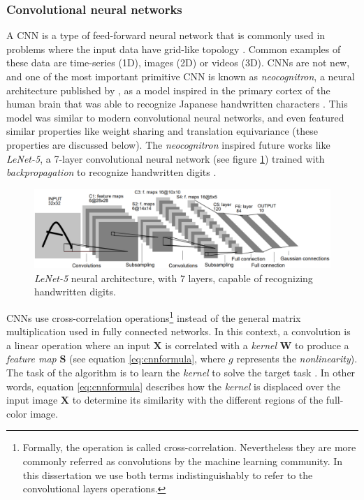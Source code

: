 \subsubsection{Convolutional neural networks}
A CNN is a type of feed-forward neural network that is commonly used in problems where the input data have grid-like topology \autocite{Goodfellow2016}. Common examples of these data are time-series (1D), images (2D) or videos (3D). CNNs are not new, and one of the most important primitive CNN is known as \textit{neocognitron}, a neural architecture published by \citealp{fukushima1980}, as a model inspired in the primary cortex of the human brain that was able to recognize Japanese handwritten characters \autocite{fukushima1980}. This model was similar to modern convolutional neural networks, and even featured similar properties like weight sharing and translation equivariance (these properties are discussed below). The \textit{neocognitron} inspired future works like \textit{LeNet-5}, a 7-layer convolutional neural network (see figure \ref{fig:lenet5}) trained with \textit{backpropagation} to recognize handwritten digits \autocite{lecun1998}.

\begin{figure}
	\centering
	\includegraphics[width=0.85\linewidth]{background/images/lenet5}
	\caption[\textit{LeNet-5} architecture]{\textit{LeNet-5} neural architecture, with 7 layers, capable of recognizing handwritten digits.}
	\label{fig:lenet5}
\end{figure}

CNNs use cross-correlation operations\footnote{Formally, the operation is called cross-correlation. Nevertheless they are more commonly referred as convolutions by the machine learning community. In this dissertation we use both terms indistinguishably to refer to the convolutional layers operations.} instead of the general matrix multiplication used in fully connected networks. In this context, a convolution is a linear operation where an input $\mathbf{X}$ is correlated with a \textit{kernel} $\mathbf{W}$ to produce a \textit{feature map} $\mathbf{S}$ (see equation \ref{eq:cnnformula}, where $g$ represents the \textit{nonlinearity}). The task of the algorithm is to learn the \textit{kernel} to solve the target task \autocite{haykin1998}. In other words, equation \ref{eq:cnnformula} describes how the \textit{kernel} is displaced over the input image $\mathbf{X}$ to determine its similarity with the different regions of the full-color image.

